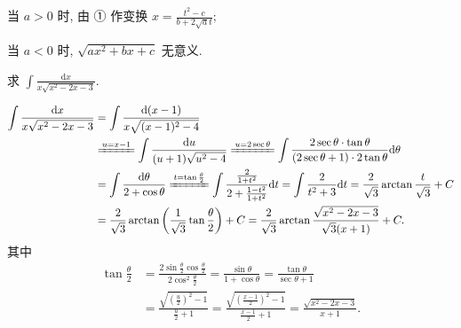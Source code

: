 当 $a>0$ 时, 由 ① 作变换 $x=\frac{t^{2}-c}{b+2\sqrt{a}t}$;

当 $a<0$ 时, $\sqrt{ax^{2}+bx+c}$ 无意义.

\begin{example}\label{ex:5.3.13}
求 $\int\frac{\mathrm{d}x}{x\sqrt{x^{2}-2x-3}}$.
\end{example}

\begin{solution}[解法 1]
\begin{align*}
\int\frac{\mathrm{d}x}{x\sqrt{x^{2}-2x-3}}&=\int\frac{\mathrm{d}(x-1)}{x\sqrt{(x-1)^{2}-4}}\\
&\xlongequal{u=x-1}\int\frac{\mathrm{d}u}{(u+1)\sqrt{u^{2}-4}}
\xlongequal{u=2\sec\theta}\int\frac{2\sec\theta\cdot\tan\theta}{(2\sec\theta+1)\cdot 2\tan\theta}\mathrm{d}\theta\\
&=\int\frac{\mathrm{d}\theta}{2+\cos\theta}
\xlongequal{t=\tan\frac{\theta}{2}}\int\frac{\frac{2}{1+t^{2}}}{2+\frac{1-t^{2}}{1+t^{2}}}\mathrm{d}t
=\int\frac{2}{t^{2}+3}\mathrm{d}t=\frac{2}{\sqrt{3}}\arctan\frac{t}{\sqrt{3}}+C\\
&=\frac{2}{\sqrt{3}}\arctan\left(\frac{1}{\sqrt{3}}\tan\frac{\theta}{2}\right)+C
=\frac{2}{\sqrt{3}}\arctan\frac{\sqrt{x^{2}-2x-3}}{\sqrt{3}(x+1)}+C.
\end{align*}
其中
\begin{align*}
\tan\frac{\theta}{2}&=\frac{2\sin\frac{\theta}{2}\cos\frac{\theta}{2}}{2\cos^{2}\frac{\theta}{2}}
=\frac{\sin\theta}{1+\cos\theta}=\frac{\tan\theta}{\sec\theta+1}\\
&=\frac{\sqrt{\left(\frac{u}{2}\right)^{2}-1}}{\frac{u}{2}+1}
=\frac{\sqrt{\left(\frac{x-1}{2}\right)^{2}-1}}{\frac{x-1}{2}+1}
=\frac{\sqrt{x^{2}-2x-3}}{x+1}.
\end{align*}
\end{solution}


